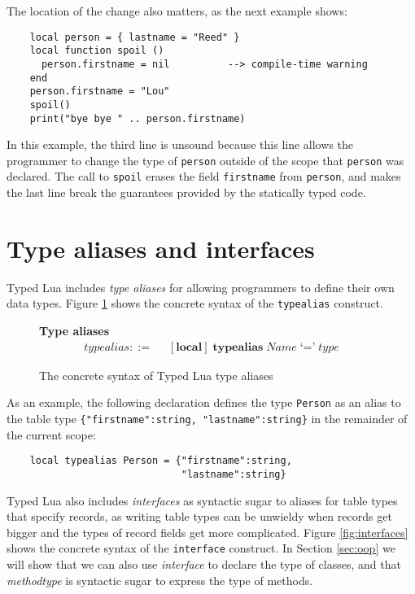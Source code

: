The location of the change also matters, as the next example shows:
\begin{verbatim}
    local person = { lastname = "Reed" }
    local function spoil ()
      person.firstname = nil          --> compile-time warning
    end
    person.firstname = "Lou"
    spoil()
    print("bye bye " .. person.firstname)
\end{verbatim}

In this example, the third line is unsound because this line allows
the programmer to change the type of \texttt{person} outside of the
scope that \texttt{person} was declared.
The call to \texttt{spoil} erases the field \texttt{firstname} from
\texttt{person}, and makes the last line break the guarantees
provided by the statically typed code.

\section{Type aliases and interfaces}
\label{sec:alias}

Typed Lua includes \emph{type aliases} for allowing programmers to
define their own data types.
Figure \ref{fig:aliases} shows the concrete syntax of the
\texttt{typealias} construct.

\begin{figure}[!ht]
\textbf{Type aliases}\\
\dstart
\begin{align*}
\textit{typealias} ::= & \;\; [\textbf{local}] \; \textbf{typealias} \; \textit{Name} \; \texttt{`='} \; \textit{type}
\end{align*}
\dend
\caption{The concrete syntax of Typed Lua type aliases}
\label{fig:aliases}
\end{figure}

As an example, the following declaration defines the type \texttt{Person}
as an alias to the table type \texttt{\{"firstname":string, "lastname":string\}}
in the remainder of the current scope:
\begin{verbatim}
    local typealias Person = {"firstname":string,
                              "lastname":string}
\end{verbatim}

Typed Lua also includes \emph{interfaces} as syntactic sugar to aliases
for table types that specify records, as writing table types can be unwieldy
when records get bigger and the types of record fields get more complicated.
Figure \ref{fig:interfaces} shows the concrete syntax of the
\texttt{interface} construct.
In Section \ref{sec:oop} we will show that we can also use \emph{interface} to
declare the type of classes, and that \emph{methodtype} is syntactic
sugar to express the type of methods.

